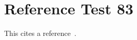 \documentclass{article}
\begin{document}
\section{Reference Test 83}
This cites a reference~\cite{test83}.

\end{document}
